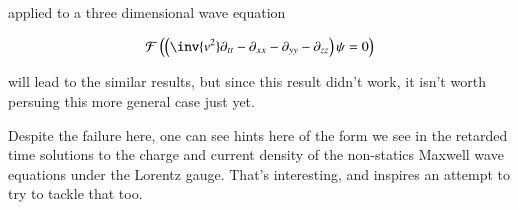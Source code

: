 \documentclass{article}
\newcommand{\FF}[0]{\mathcal{F}}
\newcommand{\IIinf}[0]{ \int_{-\infty}^\infty }
\begin{document}
applied to a three dimensional wave equation

\begin{align*}
\FF\left( \left(\inv{v^2} \partial_{tt} -\partial_{xx} -\partial_{yy} -\partial_{zz} \right)\psi = 0 \right)
\end{align*}

will lead to the similar results, but since this result didn't work, it isn't worth persuing this more general case just yet.

Despite the failure here, one can see hints here of the form we see in the retarded time solutions to the charge and current density of the non-statics Maxwell wave equations under the Lorentz gauge.  That's interesting, and inspires an attempt to try to tackle that too.

%
%
%




\end{document}
